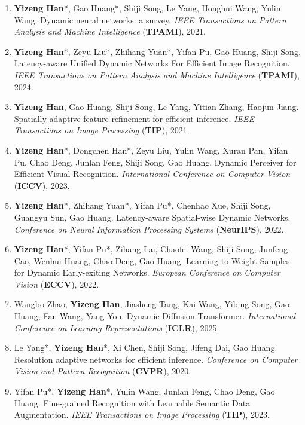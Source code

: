 \documentclass[10.5pt, UTF8]{ctexart}
\makeatletter
\newlength{\bibhang}
\newlength{\bibsep}
 {\@listi \global\bibsep\itemsep \global\advance\bibsep by\parsep}
\newenvironment{bibsection}%
        {\begin{enumerate}{%
       \setlength{\leftmargin}{-2em}%
       \setlength{\itemindent}{-2em}%
       \setlength{\itemsep}{\bibsep}%
        \setlength{\partopsep}{0pt}%
        \setlength{\topsep}{0pt}}}
        {\end{enumerate}\vspace{-.6\baselineskip}}
\makeatother
\begin{document}
\begin{sloppypar}
\begin{bibsection}
        \item \textbf{Yizeng Han}*, {Gao Huang*}, Shiji Song, Le Yang, Honghui Wang, Yulin Wang. Dynamic neural networks: a survey. \emph{IEEE Transactions on Pattern Analysis and Machine Intelligence} (\textbf{TPAMI}), 2021.
        \item \textbf{Yizeng Han}*, Zeyu Liu*, Zhihang Yuan*, Yifan Pu, Gao Huang, Shiji Song. Latency-aware Unified Dynamic Networks For Efficient Image Recognition. \emph{IEEE Transactions on Pattern Analysis and Machine Intelligence} (\textbf{TPAMI}), 2024.
        \item \textbf{Yizeng Han}, {Gao Huang}, Shiji Song, Le Yang, Yitian Zhang, Haojun Jiang. Spatially adaptive feature refinement for efficient inference. \emph{IEEE Transactions on Image Processing} (\textbf{TIP}), 2021.
        \item \textbf{Yizeng Han}*, Dongchen Han*, Zeyu Liu, Yulin Wang, Xuran Pan, Yifan Pu, Chao Deng, Junlan Feng, Shiji Song, Gao Huang. Dynamic Perceiver for Efficient Visual Recognition. \emph{International Conference on Computer Vision} (\textbf{ICCV}), 2023.
        \item \textbf{Yizeng Han}*, {Zhihang Yuan*}, {Yifan Pu*}, Chenhao Xue, Shiji Song, Guangyu Sun, Gao Huang. Latency-aware Spatial-wise Dynamic Networks. \emph{Conference on Neural Information Processing Systems} (\textbf{NeurIPS}), 2022.
        \item \textbf{Yizeng Han}*, {Yifan Pu*}, Zihang Lai, Chaofei Wang, Shiji Song, Junfeng Cao, Wenhui Huang, Chao Deng, Gao Huang. Learning to Weight Samples for Dynamic Early-exiting Networks. \emph{European Conference on Computer Vision} (\textbf{ECCV}), 2022.
        \item Wangbo Zhao, \textbf{Yizeng Han}, Jiasheng Tang, Kai Wang, Yibing Song, Gao Huang, Fan Wang, Yang You. Dynamic Diffusion Transformer. \emph{International Conference on Learning Representations} (\textbf{ICLR}), 2025.
        \item {Le Yang*}, \textbf{Yizeng Han}*, Xi Chen, Shiji Song, Jifeng Dai, Gao Huang. Resolution adaptive networks for efficient inference. \emph{Conference on Computer Vision and Pattern Recognition} (\textbf{CVPR}), 2020.
        \item Yifan Pu*, \textbf{Yizeng Han}*,  Yulin Wang, Junlan Feng, Chao Deng, Gao Huang. Fine-grained Recognition with Learnable Semantic Data Augmentation. \emph{IEEE Transactions on Image Processing} (\textbf{TIP}), 2023.

\end{bibsection}
\end{sloppypar}
\end{document}
